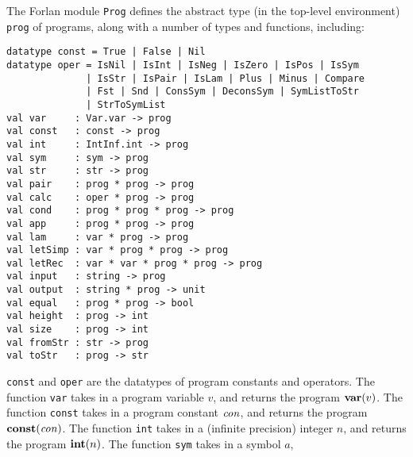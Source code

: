 The Forlan module \texttt{Prog} defines the abstract type (in the top-level
%
%
environment) \texttt{prog} of programs, along with a number of types and
functions, including:
\begin{verbatim}
datatype const = True | False | Nil
datatype oper = IsNil | IsInt | IsNeg | IsZero | IsPos | IsSym
              | IsStr | IsPair | IsLam | Plus | Minus | Compare
              | Fst | Snd | ConsSym | DeconsSym | SymListToStr
              | StrToSymList
val var     : Var.var -> prog
val const   : const -> prog
val int     : IntInf.int -> prog
val sym     : sym -> prog
val str     : str -> prog
val pair    : prog * prog -> prog
val calc    : oper * prog -> prog
val cond    : prog * prog * prog -> prog
val app     : prog * prog -> prog
val lam     : var * prog -> prog
val letSimp : var * prog * prog -> prog
val letRec  : var * var * prog * prog -> prog
val input   : string -> prog
val output  : string * prog -> unit
val equal   : prog * prog -> bool
val height  : prog -> int
val size    : prog -> int
val fromStr : str -> prog
val toStr   : prog -> str
\end{verbatim}
%
%
%
%
%
%
%
%
%
%
%
%
%
%
%
%
%
%
%
%
\texttt{const} and \texttt{oper} are the datatypes of program constants
and operators.
The function \texttt{var} takes in a program variable $v$, and
returns the program $\mathbf{var}(v)$.
The function \texttt{const} takes in a program constant $\mathit{con}$,
and returns the program $\mathbf{const}(\mathit{con})$.
The function \texttt{int} takes in a (infinite precision) integer $n$,
and returns the program $\mathbf{int}(n)$.
The function \texttt{sym} takes in a symbol $a$,
